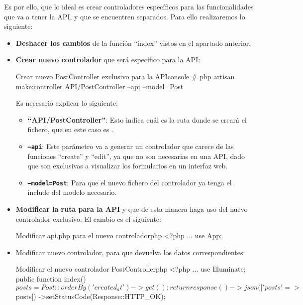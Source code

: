 Es por ello, que lo ideal es crear controladores específicos para las funcionalidades que va a tener la API, y que se encuentren separados. Para ello realizaremos lo siguiente:

\begin{itemize}
    \item \textbf{Deshacer los cambios} de la función “index” vistos en el apartado anterior.
    \item \textbf{Crear nuevo controlador} que será específico para la API:

\begin{mycode}{Crear nuevo PostController exclusivo para la API}{console}{{\small}}
# php artisan make:controller API/PostController --api --model=Post
\end{mycode}

    Es necesario explicar lo siguiente:
    \begin{itemize}
        \item \textbf{“API/PostController”}: Esto indica cuál es la ruta donde se creará el fichero, que en este caso es .

       \item \textbf{\texttt{--api}}: Este parámetro va a generar un controlador que carece de las funciones “create” y “edit”, ya que no son necesarias en una API, dado que son exclusivas a visualizar los formularios en un interfaz web.

       \item \textbf{\texttt{--model=Post}}: Para que el nuevo fichero del controlador ya tenga el include del modelo necesario.
    \end{itemize}

    \item \textbf{Modificar la ruta para la API} y que de esta manera haga uso del nuevo controlador exclusivo. El cambio es el siguiente:

\begin{mycode}{Modificar api.php para el nuevo controlador}{php}{}
<?php
...
use App\Http\Controllers\API\PostController;
\end{mycode}

    \item Modificar nuevo controlador, para que devuelva los datos correspondientes:

\begin{mycode}{Modificar el nuevo controlador PostController}{php}{}
<?php
...
use Illuminate\Http\Response;
public function index(){
    $posts = Post::orderBy('created_at')->get();
    return response()->json(['posts'=>$posts])
        ->setStatusCode(Response::HTTP_OK);
}
\end{mycode}


\end{itemize}
